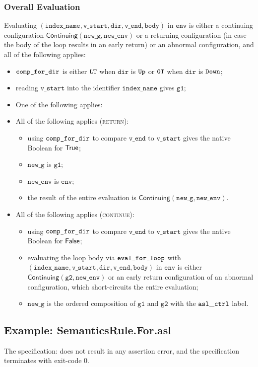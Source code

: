 \documentclass{book}
\newcommand\Continuing[0]{\textsf{Continuing}}
\newcommand\newenv[0]{\texttt{new\_env}}
\newcommand\env[0]{\texttt{env}}
\newcommand\newg[0]{\texttt{new\_g}}
\newcommand\vgone[0]{\texttt{g1}}
\newcommand\vgtwo[0]{\texttt{g2}}
\newcommand\vstart[0]{\texttt{v\_start}}
\newcommand\vend[0]{\texttt{v\_end}}
\newcommand\vbody[0]{\texttt{body}}
\newcommand\dir[0]{\texttt{dir}}
\newcommand\vindexname[0]{\texttt{index\_name}}
\begin{document}
\subsubsection{Overall Evaluation}

Evaluating $(\vindexname, \vstart, \dir, \vend, \vbody)$ in $\env$ is either
a continuing configuration $\Continuing(\newg, \newenv)$ or a returning configuration
(in case the body of the loop results in an early return)
or an abnormal configuration,
and all of the following applies:
\begin{itemize}
  \item $\texttt{comp\_for\_dir}$ is either $\texttt{LT}$ when $\dir$ is $\texttt{Up}$ or $\texttt{GT}$ when $\dir$ is $\texttt{Down}$;
  \item reading $\vstart$ into the identifier $\vindexname$ gives $\vgone$;
  \item One of the following applies:
  \item All of the following applies (\textsc{return}):
  \begin{itemize}
    \item using $\texttt{comp\_for\_dir}$ to compare $\vend$ to $\vstart$ gives the native Boolean for $\textsf{True}$;
    \item $\newg$ is $\vgone$;
    \item $\newenv$ is $\env$;
    \item the result of the entire evaluation is $\Continuing(\newg, \newenv)$.
  \end{itemize}
  \item All of the following applies (\textsc{continue}):
  \begin{itemize}
    \item using $\texttt{comp\_for\_dir}$ to compare $\vend$ to $\vstart$ gives the native Boolean for $\textsf{False}$;
    \item evaluating the loop body via $\texttt{eval\_for\_loop}$ with \\ $(\vindexname, \vstart, \dir, \vend, \vbody)$
    in $\env$ is either \\ $\Continuing(\vgtwo, \newenv)$ or an early return configuration
    of an abnormal configuration, which short-circuits the entire evaluation;
    \item $\newg$ is the ordered composition of $\vgone$ and $\vgtwo$ with the $\mathtt{asl\_ctrl}$ label.
  \end{itemize}
\end{itemize}

\subsection{Example: SemanticsRule.For.asl}
The specification:
does not result in any assertion error, and the specification terminates with exit-code $0$.
\end{document}
